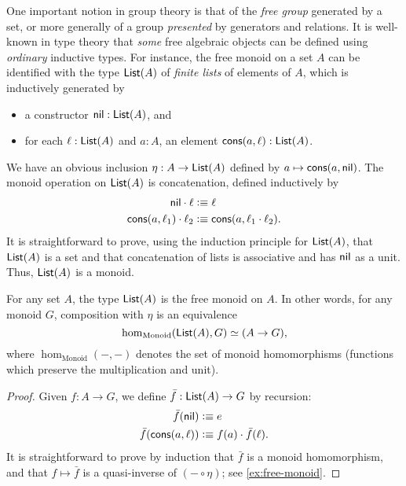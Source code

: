 %
%
One important notion in group theory is that of the \emph{free group} generated by a set, or more generally of a group \emph{presented} by generators and relations.
It is well-known in type theory that \emph{some} free algebraic objects can be defined using \emph{ordinary} inductive types.
For instance, the free monoid on a set $A$ can be identified with the type $\mathsf{List}(A)$ of \emph{finite lists} of elements of $A$, which is inductively generated by
\begin{itemize}
\item a constructor $\mathsf{nil}:\mathsf{List}(A)$, and
\item for each $\ell:\mathsf{List}(A)$ and $a:A$, an element $\mathsf{cons}(a,\ell):\mathsf{List}(A)$.
\end{itemize}
We have an obvious inclusion $\eta : A\to \mathsf{List}(A)$ defined by $a\mapsto \mathsf{cons}(a,\mathsf{nil})$.
The monoid operation on $\mathsf{List}(A)$ is concatenation, defined inductively by
\begin{align*}
  \mathsf{nil} \cdot \ell &\vcentcolon\equiv \ell\\
  \mathsf{cons} (a,\ell_1) \cdot \ell_2 &\vcentcolon\equiv \mathsf{cons}(a, \ell_1\cdot\ell_2).
\end{align*}
It is straightforward to prove, using the induction principle for $\mathsf{List}(A)$, that $\mathsf{List}(A)$ is a set and that concatenation of lists is associative
%
and has $\mathsf{nil}$ as a unit.
Thus, $\mathsf{List}(A)$ is a monoid.

\begin{lem}\label{thm:free-monoid}
  For any set $A$, the type $\mathsf{List}(A)$ is the free monoid on $A$.
  In other words, for any monoid $G$, composition with $\eta$ is an equivalence
  \[ \hom_{\mathrm{Monoid}}(\mathsf{List}(A),G) \simeq (A\to G), \]
  where $\hom_{\mathrm{Monoid}}(-,-)$ denotes the set of monoid homomorphisms (functions which preserve the multiplication and unit).
\end{lem}
\begin{proof}
  Given $f:A\to G$, we define $\bar{f}:\mathsf{List}(A) \to G$ by recursion:
  \begin{align*}
    \bar{f}(\mathsf{nil}) &\vcentcolon\equiv e\\
    \bar{f}(\mathsf{cons}(a,\ell)) &\vcentcolon\equiv f(a) \cdot \bar{f}(\ell).
  \end{align*}
  It is straightforward to prove by induction that $\bar{f}$ is a monoid homomorphism, and that $f\mapsto \bar f$ is a quasi-inverse of $(-\circ \eta)$; see \autoref{ex:free-monoid}.
\end{proof}

